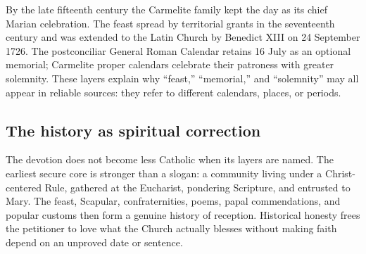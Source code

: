 By the late fifteenth century the Carmelite family kept the day as its chief Marian celebration. The feast spread by territorial grants in the seventeenth century and was extended to the Latin Church by Benedict XIII on 24 September 1726. The postconciliar General Roman Calendar retains 16 July as an optional memorial; Carmelite proper calendars celebrate their patroness with greater solemnity. These layers explain why ``feast,'' ``memorial,'' and ``solemnity'' may all appear in reliable sources: they refer to different calendars, places, or periods.

\subsection{The history as spiritual correction}

The devotion does not become less Catholic when its layers are named. The earliest secure core is stronger than a slogan: a community living under a Christ-centered Rule, gathered at the Eucharist, pondering Scripture, and entrusted to Mary. The feast, Scapular, confraternities, poems, papal commendations, and popular customs then form a genuine history of reception. Historical honesty frees the petitioner to love what the Church actually blesses without making faith depend on an unproved date or sentence.
